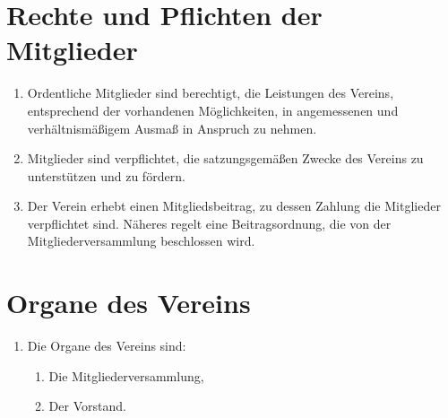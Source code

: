 \documentclass[a4paper,DIV10,12pt,headsepline]{scrartcl}
\begin{document}
\section{Rechte und Pflichten der Mitglieder}
\begin{enumerate}
	\item Ordentliche Mitglieder sind berechtigt, die Leistungen des Vereins, entsprechend der vorhandenen Möglichkeiten, in angemessenen und verhältnismäßigem Ausmaß in Anspruch zu nehmen.
	\item Mitglieder sind verpflichtet, die satzungsgemäßen Zwecke des Vereins zu unterstützen und zu fördern.
	\item Der Verein erhebt einen Mitgliedsbeitrag, zu dessen Zahlung die Mitglieder verpflichtet sind. Näheres regelt eine Beitragsordnung, die von der Mitgliederversammlung beschlossen wird.
\end{enumerate}

\section{Organe des Vereins}
\begin{enumerate}
	\item Die Organe des Vereins sind:
	\begin{enumerate}
		\item Die Mitgliederversammlung,
		\item Der Vorstand.
	\end{enumerate}
\end{enumerate}
\end{document}
